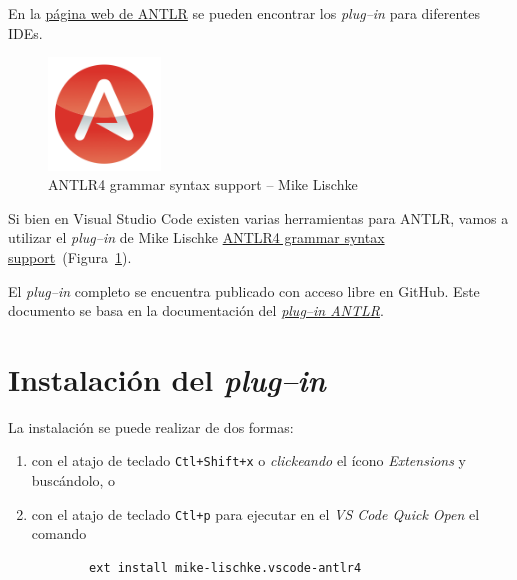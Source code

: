 \documentclass[a5paper,10pt]{article}
\begin{document}
En la \href{https://www.antlr.org/tools.html}{página web de ANTLR} se pueden encontrar los \emph{plug--in} para diferentes IDEs.

\begin{figure}[b]
	\centering
	\includegraphics[width=3cm]{img/IconoANTLRvscode}
	\caption{ANTLR4 grammar syntax support -- Mike Lischke}
	\label{icono}
\end{figure}

Si bien en Visual Studio Code existen varias herramientas para ANTLR, vamos a utilizar el \emph{plug--in} de Mike Lischke \href{https://marketplace.visualstudio.com/items?itemName=mike-lischke.vscode-antlr4}{ANTLR4 grammar syntax support}~(Figura~\ref{icono}).

El \emph{plug--in} completo se encuentra publicado con acceso libre en GitHub.  Este documento se basa en la documentación del \href{https://github.com/mike-lischke/vscode-antlr4/tree/master/doc}{\emph{plug--in ANTLR}}.



\section{Instalación del \emph{plug--in}}
\label{instalacion}

La instalación se puede realizar de dos formas:
\begin{enumerate}
	\item con el atajo de teclado \verb|Ctl+Shift+x| o \emph{clickeando} el ícono \emph{Extensions} y buscándolo, o
    \item con el atajo de teclado \verb|Ctl+p| para ejecutar en el \emph{VS Code Quick Open} el comando
    \begin{verbatim}
		ext install mike-lischke.vscode-antlr4
	\end{verbatim}
\end{enumerate}

\end{document}
